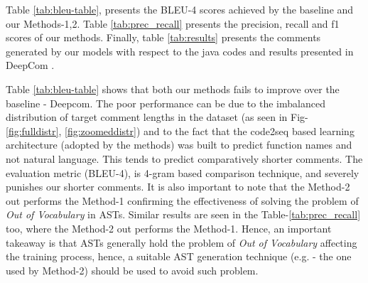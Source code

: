 \documentclass[a4paper,10pt]{article}
\theoremstyle{plain}
\theoremstyle{definition}
\begin{document}
\begin{multicols*}{2}
Table \ref{tab:bleu-table}, presents the BLEU-4 scores achieved by the baseline and our Methods-1,2. Table \ref{tab:prec_recall} presents the precision, recall and f1 scores of our methods. Finally, table \ref{tab:results} presents the comments generated by our models with respect to the java codes and results presented in DeepCom \cite{hu2018deep}.

Table \ref{tab:bleu-table} shows that both our methods fails to improve over the baseline - Deepcom. The poor performance can be due to the imbalanced distribution of target comment lengths in the dataset (as seen in Fig-\ref{fig:fulldistr}, \ref{fig:zoomeddistr}) and to the fact that the code2seq based learning architecture (adopted by the methods) was built to predict function names and not natural language. This tends to predict comparatively shorter comments. The evaluation metric (BLEU-4), is 4-gram based comparison technique, and severely punishes our shorter comments. It is also important to note that the Method-2 out performs the Method-1 confirming the effectiveness of solving the problem of \textit{Out of Vocabulary} in ASTs. Similar results are seen in the Table-\ref{tab:prec_recall} too, where the Method-2 out performs the Method-1. Hence, an important takeaway is that ASTs generally hold the problem of \textit{Out of Vocabulary} affecting the training process, hence, a suitable AST generation technique (e.g. \cite{ZHOU2019328} - the one used by Method-2) should be used to avoid such problem.

\end{multicols*}
\end{document}
